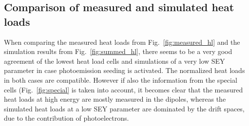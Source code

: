 \subsection{Comparison of measured and simulated heat loads}

When comparing the measured heat loads from Fig.~\ref{fig:measured_hl} and the simulation results from Fig.~\ref{fig:summed_hl}, there seems to be a very good agreement of the lowest heat load cells and simulations of a very low SEY parameter in case photoemission seeding is activated.
The normalized heat loads in both cases are compatible.
However if also the information from the special cells (Fig.~\ref{fig:special} is taken into account, it becomes clear that the measured heat loads at high energy are mostly measured in the dipoles, whereas the simulated heat loads at a low SEY parameter are dominated by the drift spaces, due to the contribution of photoelectrons.



